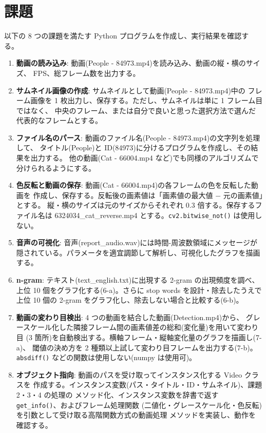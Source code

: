 \section{課題}

以下の 8 つの課題を満たす Python プログラムを作成し、実行結果を確認する。

\begin{enumerate}
\item \textbf{動画の読み込み}: 動画(People - 84973.mp4)を読み込み、動画の縦・横のサイズ、
      FPS、総フレーム数を出力する。
\item \textbf{サムネイル画像の作成}: サムネイルとして動画(People - 84973.mp4)中の
      フレーム画像を 1 枚出力し、保存する。ただし、サムネイルは単に 1 フレーム目ではなく、
      中央のフレーム、または自分で良いと思った選択方法で選んだ代表的なフレームとする。
\item \textbf{ファイル名のパース}: 動画のファイル名(People - 84973.mp4)の文字列を処理して、
      タイトル(People)と ID(84973)に分けるプログラムを作成し、その結果を出力する。
      他の動画(Cat - 66004.mp4 など)でも同様のアルゴリズムで分けられるようにする。
\item \textbf{色反転と動画の保存}: 動画(Cat - 66004.mp4)の各フレームの色を反転した動画を
      作成し、保存する。反転後の画素値は「画素値の最大値 $-$ 元の画素値」とする。
      縦・横のサイズは元のサイズからそれぞれ 0.3 倍する。保存するファイル名は
      6324034\_cat\_reverse.mp4 とする。{\tt cv2.bitwise\_not()} は使用しない。
\item \textbf{音声の可視化}: 音声(report\_audio.wav)には時間-周波数領域にメッセージが
      隠されている。パラメータを適宜調節して解析し、可視化したグラフを描画する。
\item \textbf{n-gram}: テキスト(text\_english.txt)に出現する 2-gram の出現頻度を調べ、
      上位 10 個をグラフ化する(6-a)。さらに stop words を設計・除去したうえで
      上位 10 個の 2-gram をグラフ化し、除去しない場合と比較する(6-b)。
\item \textbf{動画の変わり目検出}: 4 つの動画を結合した動画(Detection.mp4)から、
      グレースケール化した隣接フレーム間の画素値差の総和(変化量)を用いて変わり目
      (3 箇所)を自動検出する。横軸フレーム・縦軸変化量のグラフを描画し(7-a)、
      閾値の決め方を 2 種類以上試して変わり目フレームを出力する(7-b)。
      {\tt absdiff()} などの関数は使用しない(numpy は使用可)。
\item \textbf{オブジェクト指向}: 動画のパスを受け取ってインスタンス化する Video クラスを
      作成する。インスタンス変数(パス・タイトル・ID・サムネイル)、課題 2・3・4 の処理の
      メソッド化、インスタンス変数を辞書で返す {\tt get\_info()}、およびフレーム処理関数
      (二値化・グレースケール化・色反転)を引数として受け取る高階関数方式の動画処理
      メソッドを実装し、動作を確認する。
\end{enumerate}
